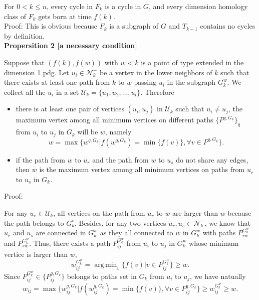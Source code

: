 \documentclass[a4paper,12pt]{article}
\numberwithin{equation}{section}
\DeclareMathOperator*{\argmin}{arg\,min}
\begin{document}
	For $0 < k \leq n$, every cycle in $F_k$ is a cycle in $G$, and every dimension homology class of $F_k$ gets born at time $f(k)$.\\
	
	\noindent Proof: This is obvious because $F_k$ is a subgraph of $G$ and $T_{k-1}$ contains no cycles by definition.\\
	
	\noindent \textbf{Propersition 2 [a necessary condition]}
	
	Suppose that $(f(k), f(w))$ with $w < k$ is a point of type extended in the dimension 1 pdg. Let $u_i \in \mathcal{N}_k^-$ be a vertex in the lower neighbors of $k$ such that there exists at least one path from $k$ to $w$ passing $u_i$ in the subgraph $G_k^w$. We collect all the $u_i$ in a set $\mathcal{U}_k = \{ u_1,u_2,\ldots, u_l\}$. Therefore
	\begin{itemize}
	 \item there is at least one pair of vertices $(u_i, u_j)$ in $\mathcal{U}_k$ such that $u_i \neq u_j$, the maximum vertex among all minimum vertices on different paths $\{ P^{q,G_k} \}_q$ from $u_i$ to $u_j$ in $G_k$ will be $w$, namely 
	$$w = \max \{ w^{q,G_k} \vert f(w^{q,G_k}) = \min \{ f(v) \}, \forall v \in P^{q,G_k}  \}.$$
	
	\item if the path from $w$ to $u_r$ and the path from $w$ to $u_s$ do not share any edges, then $w$ is the maximum vertex among all minimum vertices on paths from $u_r$ to $u_s$ in $G_k$.
	\end{itemize}	
	
	\noindent Proof: 
	
	For any $u_r \in \mathcal{U}_k$, all vertices on the path from $u_r$ to $w$ are larger than $w$ because the path belongs to $G_k^r$. Besides, for any two vertices $u_r, u_s \in \mathcal{N}_k^-$, we know that $u_r$ and $u_s$ are connected in $G_k^w$ as they all connected to $w$ in $G_k^w$ with paths $P_{rw}^{G_k^w}$ and $P_{sw}^{G_k^w}$. Thus, there exists a path $P_{ij}^{G_k^w}$ from $u_i$ to $u_j$ in $G_k^w$ whose minimum vertice is larger than $w$,
	$$ w_{ij}^{G_k^w} = \argmin_{v} \{ f(v) \vert v \in P_{ij}^{G_k^w} \} \geq w.$$	
	Since $P_{ij}^{G_k^w} \in \{ P_{ij}^{q,G_k} \}$ belongs to paths set in $G_k$ from $u_i$ to $u_j$, we have natually 
	$$ w_{ij} = \max \{ w_{ij}^{q,G_k} \vert f(w_{ij}^{q,G_k}) = \min \{ f(v) \}, \forall v \in P^{q,G_k}_{ij}  \} \geq w_{ij}^{G_k^w} \geq w. $$
	
\end{document}
